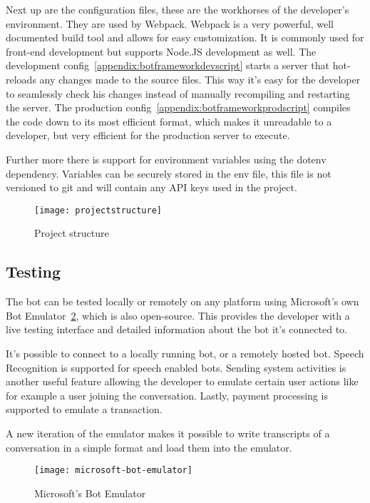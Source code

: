 Next up are the configuration files, these are the workhorses of the developer's environment. They are used by Webpack\cite{webpack}. Webpack is a very powerful, well documented build tool and allows for easy customization. It is commonly used for front-end development but supports Node.JS development as well. The development config~\ref{appendix:botframeworkdevscript} starts a server that hot-reloads any changes made to the source files. This way it's easy for the developer to seamlessly check his changes instead of manually recompiling and restarting the server. The production config~\ref{appendix:botframeworkprodscript} compiles the code down to its most efficient format, which makes it unreadable to a developer, but very efficient for the production server to execute.

Further more there is support for environment variables using the dotenv\cite{dotenv} dependency. Variables can be securely stored in the env file, this file is not versioned to git and will contain any API keys used in the project.

\begin{figure}[ht]
	\centering
	\texttt{[image: projectstructure]}\label{fig:projectstructure}
	\caption{Project structure}
\end{figure}

\subsection{Testing}

The bot can be tested locally or remotely on any platform using Microsoft's own Bot Emulator~\ref{fig:microsoft-bot-emulator}, which is also open-source. This provides the developer with a live testing interface and detailed information about the bot it's connected to.

It's possible to connect to a locally running bot, or a remotely hosted bot. Speech Recognition is supported for speech enabled bots. Sending system activities is another useful feature allowing the developer to emulate certain user actions like for example a user joining the conversation. Lastly, payment processing is supported to emulate a transaction.

A new iteration of the emulator makes it possible to write transcripts of a conversation in a simple format and load them into the emulator.

\begin{figure}[!hb]
	\centering
	\texttt{[image: microsoft-bot-emulator]}\label{fig:microsoft-bot-emulator}
	\caption{Microsoft's Bot Emulator~\cite{microsoft-bot-emulator}}
\end{figure}

